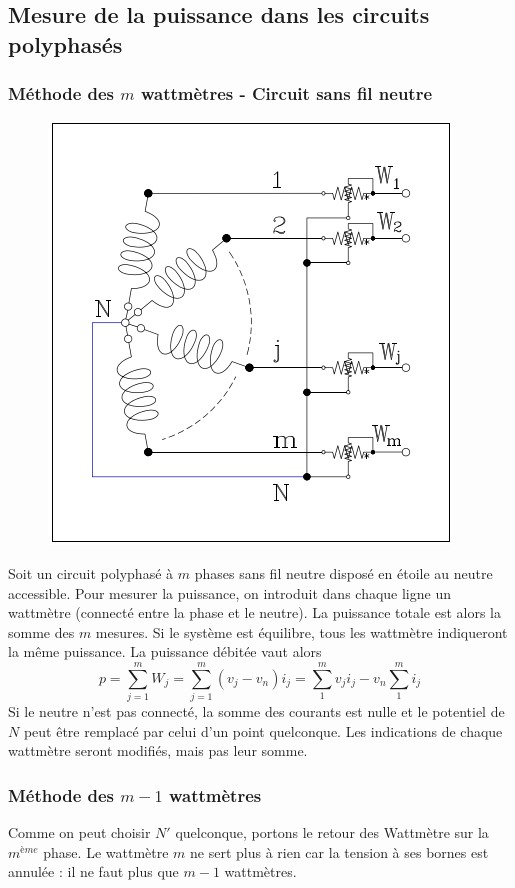 \subsection{Mesure de la puissance dans les circuits polyphasés}
\subsubsection{Méthode des $m$ wattmètres - Circuit sans fil neutre}
\begin{figure}
	\vspace{-11mm}
	\includegraphics[scale=0.4]{ch1/image11.png}
\end{figure}
Soit un circuit polyphasé à $m$ phases sans fil neutre disposé en 
étoile au neutre accessible. Pour mesurer la puissance, on introduit 
dans chaque ligne un wattmètre (connecté entre la phase et le neutre). 
La puissance totale est alors la somme des $m$ mesures. Si le système 
est équilibre, tous les wattmètre indiqueront la même puissance. La 
puissance débitée vaut alors
\begin{equation}
	p = \sum_{j=1}^m W_j = \sum_{j=1}^m (v_j-v_n)i_j = \sum_1^m v_ji_j -
	v_n\sum_1^m i_j
\end{equation}
Si le neutre n'est pas connecté, la somme des courants est nulle et le 
potentiel de $N$ peut être remplacé par celui d'un point quelconque. Les 
indications de chaque wattmètre seront modifiés, mais pas leur somme.
		
\subsubsection{Méthode des $m-1$ wattmètres}
Comme on peut choisir $N'$ quelconque, portons le retour des Wattmètre 
sur la $m^{ème}$ phase. Le wattmètre $m$ ne sert plus à rien car la 
tension à ses bornes est annulée : il ne faut plus que $m-1$ wattmètres.
		
